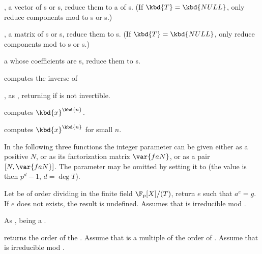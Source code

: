 ,  a vector of s or
s, reduce them to a  of s. (If $\kbd{T} = \kbd{NULL}$, only
reduce components mod  to s or s.)

,  a matrix of s or
s, reduce them to s. (If $\kbd{T} = \kbd{NULL}$, only
reduce components mod  to s or s.)

  a 
whose coefficients are s, reduce them to s.







 computes the inverse of 

, as , returning
 if  is not invertible.

 computes $\kbd{x}^\kbd{n}$.

 computes $\kbd{x}^\kbd{n}$
for small $n$.

In the following three functions the integer parameter  can be given
either as a positive  $N$, or as its factorization matrix $\var{faN}$,
or as a pair $[N,\var{faN}]$. The parameter may be omitted by setting it to
 (the value is then $p^d-1$, $d = \deg T$).

 Let  be of
order dividing  in the finite field $\F_p[X]/(T)$, return $e$ such that
$a^e=g$. If $e$ does not exists, the result is undefined. Assumes
that  is irreducible mod .

 As
,  being a .

 returns the order of the
 . Assume that  is a multiple of the order of
. Assume that  is irreducible mod .

